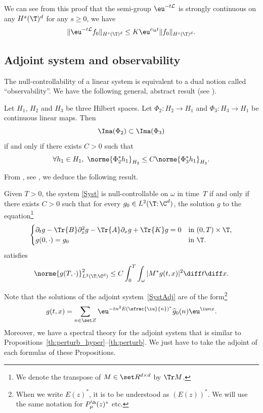 \begin{remark}\label{rk:semigroup_Hs}
We can see from this proof that the semi-group $\eu^{-t\mathcal L}$ is strongly continuous on any $H^s(\T)^d$ for any $s\geq 0$, \ie we have
\[
\|\eu^{-t\mathcal L} f_0\|_{H^s(\T)^d} \leq K\eu^{c_\h t}\|f_0\|_{H^s(\T)^d}.
\]
\end{remark}

\subsection{Adjoint system and observability}
\label{Paragraphdual}

The null-controllability of a linear system is equivalent to a dual notion called ``observability''. We have the following general, abstract result (see \cite[Lem.\,2.48]{coron_2007}).
\begin{lemma}
\label{LemmaDuality}
Let $H_1$, $H_2$ and $H_3$ be three Hilbert spaces. Let $\Phi_2\colon H_2 \to H_1$ and $\Phi_3\colon H_3 \to H_1$ be continuous linear maps. Then
\[
\Ima(\Phi_2) \subset \Ima(\Phi_3)
\]
if and only if there exists $C>0$ such that
\[
\forall h_1 \in H_1,\ \norme{\Phi_2^{*} h_1}_{H_2} \leq C \norme{\Phi_3^{*} h_1}_{H_3}.
\]
\end{lemma}

\pagebreak[2]
From , see \cite[Th.\,2.44]{coron_2007}, we deduce the following result.
\begin{prop}\label{Hum}
Given $T>0$, the system \eqref{Syst} is null-controllable on $\omega$ in time~$T$ if and only if there exists $C>0$ such that for every $g_0 \in L^2(\T;\C^{d})$, the solution $g$ to the equation\footnote{We denote the transpose of $M\in\set R^{d\times d}$ by $\Tr M$.}
\begin{equation}
\label{SystAdj}
\begin{cases}
\partial_t g - \Tr{B} \partial_{x}^2 g - \Tr{A} \partial_x g + \Tr{K} g = 0&\text{in}\ (0,T)\times\T,\\
g(0,\cdot)=g_{0}& \text{in}\ \T.
\end{cases}
\end{equation}
satisfies
\begin{equation}
\label{ObsHumG}
\norme{g(T,\cdot)}_{L^2(\T;\C^{d})}^2 \leq C \int_{0}^{T} \int_{\omega} |M^* g(t,x)|^{2} \diff t \diff x.
\end{equation}
\end{prop}

Note that the solutions of the adjoint system~\eqref{SystAdj} are of the form\footnote{When we write $E(z)^\ast$, it is to be understood as $(E(z))^\ast$. We will use the same notation for $P_\mu^\h(z)^\ast$ etc.}
\begin{equation}\label{eq:sol_adj}
g(t,x) = \sum_{n\in\set Z} \eu^{- tn^2E\left(\sfrac{\iu}{n}\right)^\ast} \widehat{g}_0(n) \eu^{\iu nx}.
\end{equation}
Moreover, we have a spectral theory for the adjoint system that is similar to Propositions~\ref{th:perturb_hyper}--\ref{th:perturb}. We just have to take the adjoint of each formulas of these Propositions.

